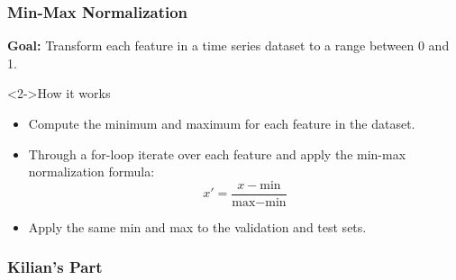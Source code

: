 \documentclass[t,english]{beamer}
\begin{document}
\begin{frame}
  \frametitle{Min-Max Normalization}
  \textbf{Goal:} Transform each feature in a time series dataset to a range between 0 and 1.

  \begin{block}<2->{How it works}
    \begin{itemize}
      \item<2-> Compute the minimum and maximum for each feature in the dataset.
      \item<3-> Through a for-loop iterate over each feature and apply the min-max normalization formula:
            \begin{equation}
              x' = \frac{x - \text{min}}{\text{max} - \text{min}}
            \end{equation}
      \item<4-> Apply the same min and max to the validation and test sets.
    \end{itemize}
  \end{block}
\end{frame}



\begin{frame}
  \frametitle{Kilian's Part}

\end{frame}
\end{document}
